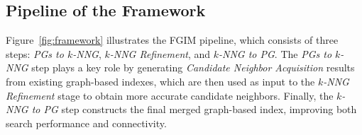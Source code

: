 \documentclass[acmsmall]{acmart}
\theoremstyle{remark}
\theoremstyle{definition}
\begin{document}
\subsection{Pipeline of the Framework}
\label{subsec:framework}

Figure~\ref{fig:framework} illustrates the FGIM pipeline, which consists of three steps: \textit{PGs to $k$-NNG}, \textit{$k$-NNG Refinement}, and \textit{$k$-NNG to PG}. The \textit{PGs to $k$-NNG} step plays a key role by generating \textit{Candidate Neighbor Acquisition} results from existing graph-based indexes, which are then used as input to the \textit{$k$-NNG Refinement} stage to obtain more accurate candidate neighbors. Finally, the \textit{$k$-NNG to PG} step constructs the final merged graph-based index, improving both search performance and connectivity.
\end{document}
